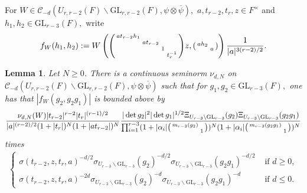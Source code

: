\documentclass[12pt]{amsart}
\newtheorem{lem}[thm]{Lemma}
\theoremstyle{remark}
\numberwithin{equation}{section}
\newcommand{\GL}{\mathrm{GL}}
\theoremstyle{definition}
\newenvironment{psmatrix}
  {\left(\begin{smallmatrix}}
  {\end{smallmatrix}\right)}
\numberwithin{equation}{subsection}
\begin{document}
For $W \in \mathcal{C}_{-d}(U_{r,r-2}(F) \backslash \GL_{r,r-2}(F),\psi \otimes \overline{\psi}),$ $a,t_{r-2},t_r,z \in F^\times$ and $h_1,h_2 \in \GL_{r-3}(F),$ write
\begin{align} \label{fW}
f_{W}(h_1,h_2):=W\left(\begin{psmatrix}at_{r-2} h_1 & & &\\ & at_{r-2}  & \\ & & 1 & \\ & & &t_r^{-1}  \end{psmatrix}z,\begin{psmatrix} ah_2 & \\ & a\end{psmatrix}  \right)\frac{1}{|a|^{3(r-2)/2}}.
\end{align}
\begin{lem} \label{lem:fW}
Let $N\ge 0$. There is a continuous seminorm $\nu_{d,N}$ on $\mathcal{C}_{-d}(U_{r,r-2}(F) \backslash \GL_{r,r-2}(F),\psi \otimes \overline{\psi})$ such that for $g_1,g_2 \in \GL_{r-3}(F),$ one has that
$|f_W(g_2,g_2g_1)|$ is bounded above by 
\begin{align} \label{no:sigs}
\frac{\nu_{d,N}(W)|t_{r-2}|^{r-2}|t_r|^{(r-1)/2}}{|a|^{(r-2)/2}(1+|t_r|)^{N}(1+|at_{r-2}|)^N}\frac{
|\det g_2|^{2}|\det g_1|^{1/2}\Xi_{U_{r-3} \backslash \GL_{r-3}}(g_2)\Xi_{U_{r-3} \backslash \GL_{r-3}}(g_2g_1)}
{\prod_{i=1}^{r-3}(1+|\alpha_i|\begin{psmatrix} m_{r-3}(g_2) & \\ & 1 \end{psmatrix})^{N}(1+|\alpha_i|\begin{psmatrix} m_{r-3}(g_2g_1) & \\ & 1 \end{psmatrix})^{N}}
\end{align}
times 
\begin{align}
\label{log:terms}\begin{cases} \sigma(t_{r-2},z,t_r,a)^{-d/2}\sigma_{U_{r-3} \backslash \GL_{r-3}}(g_2)^{-d/2}\sigma_{U_{r-3} \backslash \GL_{r-3}}(g_2g_1)^{-d/2} & \textrm{ if }d \geq 0,\\
\sigma(t_{r-2},z,t_r,a)^{-2d}\sigma_{U_{r-3} \backslash \GL_{r-3}}(g_2)^{-d}\sigma_{U_{r-3}\backslash \GL_{r-3}}(g_2g_1)^{-d} & \textrm{ if }d \leq 0. \end{cases}
\end{align}
\end{lem}
\end{document}
